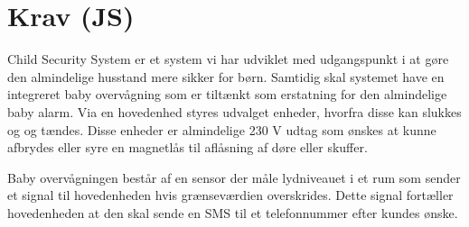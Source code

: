 \chapter{Krav (JS)}
Child Security System er et system vi har udviklet med udgangspunkt i at gøre den almindelige husstand mere sikker for børn. Samtidig skal systemet have en integreret baby overvågning som er tiltænkt som erstatning for den almindelige baby alarm.
Via en hovedenhed styres udvalget enheder, hvorfra disse kan slukkes og og tændes. Disse enheder er almindelige 230 V udtag som ønskes at kunne afbrydes eller syre en magnetlås til aflåsning af døre eller skuffer.

Baby overvågningen består af en sensor der måle lydniveauet i et rum som sender et signal til hovedenheden hvis grænseværdien overskrides. Dette signal fortæller hovedenheden at den skal sende en SMS til et telefonnummer efter kundes ønske.   
